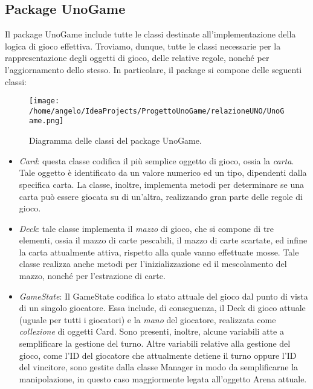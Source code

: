 \documentclass[11pt]{article} %
\begin{document}
\subsection{Package UnoGame}
Il package UnoGame include tutte le classi destinate all'implementazione della logica di gioco effettiva. Troviamo, dunque, tutte le classi necessarie per la rappresentazione degli oggetti di gioco, delle relative regole, nonché per l'aggiornamento dello stesso. In particolare, il package si compone delle seguenti classi:
\begin{figure}[h]
\centering%
\texttt{[image: /home/angelo/IdeaProjects/ProgettoUnoGame/relazioneUNO/UnoGame.png]}%
\caption{Diagramma delle classi del package UnoGame.}
\end{figure}

\begin{itemize}
	\item \emph{Card}: questa classe codifica il più semplice oggetto di gioco, ossia la \textit{carta}. Tale oggetto è identificato da un valore numerico ed un tipo, dipendenti dalla specifica carta. La classe, inoltre, implementa metodi per determinare se una carta può essere giocata su di un'altra, realizzando gran parte delle regole di gioco.
	\item \emph{Deck}: tale classe implementa il \textit{mazzo} di gioco, che si compone di tre elementi, ossia il mazzo di carte pescabili, il mazzo di carte scartate, ed infine la carta attualmente attiva, rispetto alla quale vanno effettuate mosse. Tale classe realizza anche metodi per l'inizializzazione ed il mescolamento del mazzo, nonché per l'estrazione di carte. 
	\item \emph{GameState}: Il GameState codifica lo stato attuale del gioco dal punto di vista di un singolo giocatore. Essa include, di conseguenza, il Deck di gioco attuale (uguale per tutti i giocatori) e la \textit{mano} del giocatore, realizzata come \textit{collezione} di oggetti Card. Sono presenti, inoltre, alcune variabili atte a semplificare la gestione del turno. Altre variabili relative alla gestione del gioco, come l'ID del giocatore che attualmente detiene il turno oppure l'ID del vincitore, sono gestite dalla classe Manager in modo da semplificarne la manipolazione, in questo caso maggiormente legata all'oggetto Arena attuale.
\end{itemize} 
\end{document}
